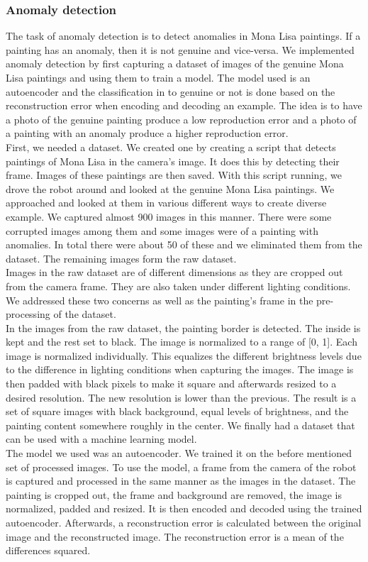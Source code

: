 \documentclass[a4paper,
  twoside, %
  headlines=2.1 %
  ]{scrartcl}
\begin{document}
\subsubsection{Anomaly detection}
The task of anomaly detection is to detect anomalies in Mona Lisa paintings. If a painting has an anomaly, then it is not genuine and vice-versa. We implemented anomaly detection by first capturing a dataset of images of the genuine Mona Lisa paintings and using them to train a model. The model used is an autoencoder and the classification in to genuine or not is done based on the reconstruction error when encoding and decoding an example. The idea is to have a photo of the genuine painting produce a low reproduction error and a photo of a painting with an anomaly produce a higher reproduction error. 
\\
First, we needed a dataset. We created one by creating a script that detects paintings of Mona Lisa in the camera’s image. It does this by detecting their frame. Images of these paintings are then saved. With this script running, we drove the robot around and looked at the genuine Mona Lisa paintings. We approached and looked at them in various different ways to create diverse example. We captured almost 900 images in this manner. There were some corrupted images among them and some images were of a painting with anomalies. In total there were about 50 of these and we eliminated them from the dataset. The remaining images form the raw dataset.
\\
Images in the raw dataset are of different dimensions as they are cropped out from the camera frame. They are also taken under different lighting conditions. We addressed these two concerns as well as the painting’s frame in the pre-processing of the dataset. 
\\
In the images from the raw dataset, the painting border is detected. The inside is kept and the rest set to black. The image is normalized to a range of [0, 1]. Each image is normalized individually. This equalizes the different brightness levels due to the difference in lighting conditions when capturing the images. The image is then padded with black pixels to make it square and afterwards resized to a desired resolution. The new resolution is lower than the previous. The result is a set of square images with black background, equal levels of brightness, and the painting content somewhere roughly in the center. We finally had a dataset that can be used with a machine learning model. 
\\
The model we used was an autoencoder. We trained it on the before mentioned set of processed images. 
To use the model, a frame from the camera of the robot is captured and processed in the same manner as the images in the dataset. The painting is cropped out, the frame and background are removed, the image is normalized, padded and resized. It is then encoded and decoded using the trained autoencoder. Afterwards, a reconstruction error is calculated between the original image and the reconstructed image. The reconstruction error is a mean of the differences squared.
\end{document}
